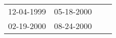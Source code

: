 \begin{supertabular}{llll}
 12-04-1999 &  05-18-2000 \\
 02-19-2000 &  08-24-2000 \\
\end{supertabular}
